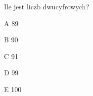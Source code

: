 \begin{tresc}
Ile jest liczb dwucyfrowych?
\end{tresc}
\begin{wariant}{A} 89 \end{wariant}
\begin{wariant}{B} 90 \end{wariant}
\begin{wariant}{C} 91 \end{wariant}
\begin{wariant}{D} 99 \end{wariant}
\begin{wariant}{E} 100 \end{wariant}
